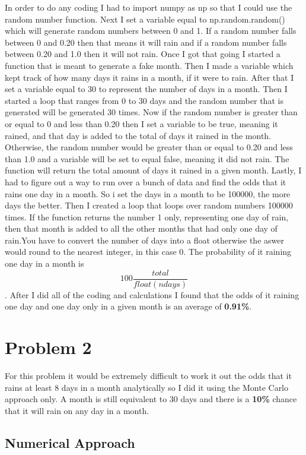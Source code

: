 \documentclass[twocolumn]{revtex4}
\begin{document}
In order to do any coding I had to import numpy as np so that I could use the random number function. Next I set a variable equal to np.random.random() which will generate random numbers between 0 and 1. If a random number falls between 0 and 0.20 then that means it will rain and if a random number falls between 0.20 and 1.0 then it will not rain. Once I got that going I  started a function that is meant to generate a fake month. Then I made a variable which kept track of how many days it rains in a month, if it were to rain. After that I set a variable equal to 30 to represent the number of days in a month. Then I started a loop that ranges from 0 to 30 days and the random number that is generated will be generated 30 times. Now if  the random number is greater than or equal to  0 and less than 0.20 then I set a variable to be true, meaning it rained, and that day is added to the total of days it rained in the month. Otherwise, the random number would be greater than or equal to 0.20 and less than 1.0 and a variable will be set to equal false, meaning it did not rain. The function will return the total amount of days it rained in a given month. Lastly, I had to figure out a way to run over a bunch of data and find the odds that it rains one day in a month. So i set the days in a month to be 100000, the more days the better. Then I created a loop that loops over random numbers 100000 times. If the function returns the number 1 only, representing one day of rain, then that month is added to all the other months that had only one day of rain.You have to convert the number of days into a float otherwise the aswer would round to the nearest integer, in this case 0. The probability of it raining one day in a month is $$100 \frac{total}{float(ndays)}$$. After I did all of the coding and calculations I found that the odds of it raining one day and one day only in a given month is an average of {\bf 0.91\%}. 

\section{\bf Problem 2}

For this problem it would be extremely difficult to work it out the odds that it rains at least 8 days in a month analytically so I did it using the Monte Carlo approach only. A month is still equivalent to 30 days and there is a {\bf 10\%} chance that it will rain on any day in a month.

\subsection{\bf Numerical Approach}
\end{document}
